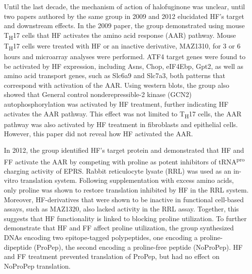 Until the last decade, the mechanism of action of halofuginone was unclear, until two papers authored by the same group in 2009\cite{sundrud2009halofuginone} and 2012\cite{keller2012halofuginone} elucidated HF's target and downstream effects.
In the 2009 paper, the group demonstrated using mouse T\textsubscript{H}17 cells that HF activates the amino acid response (AAR) pathway.
Mouse T\textsubscript{H}17 cells were treated with HF or an inactive derivative, MAZ1310, for 3 or 6 hours and microarray analyses were performed.
ATF4 target genes were found to be activated by HF expression, including Asns, Chop, eIF4Ebp, Gpt2, as well as amino acid transport genes, such as Slc6a9 and Slc7a3, both patterns that correspond with activation of the AAR.
Using western blots, the group also showed that General control nonderepressible-2 kinase (GCN2) autophosphorylation was activated by HF treatment, further indicating HF activates the AAR pathway.
This effect was not limited to T\textsubscript{H}17 cells, the AAR pathway was also activated by HF treatment in fibroblasts and epithelial cells\cite{sundrud2009halofuginone}.
However, this paper did not reveal how HF activated the AAR\@.

In 2012, the group identified HF's target protein and demonstrated that HF and FF activate the AAR by competing with proline as potent inhibitors of tRNA\textsuperscript{pro} charging activity of EPRS\@.
Rabbit reticulocyte lysate (RRL) was used as an in-vitro translation system.
Following supplementation with excess amino acids, only proline was shown to restore translation inhibited by HF in the RRL system.
Moreover, HF-derivatives that were shown to be inactive in functional cell-based assays, such as MAZ1320, also lacked activity in the RRL assay.
Together, this suggests that HF functionality is linked to blocking proline utilization.
To further demonstrate that HF and FF affect proline utilization, the group synthesized DNAs encoding two epitope-tagged polypeptides, one encoding a proline-dipeptide (ProPep), the second encoding a proline-free peptide (NoProPep).
HF and FF treatment prevented translation of ProPep, but had no effect on NoProPep translation\cite{keller2012halofuginone}.

